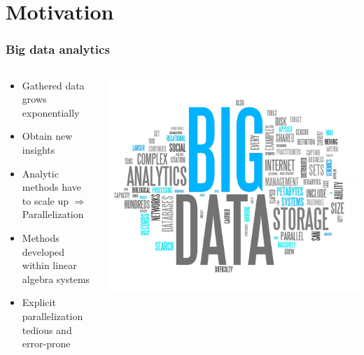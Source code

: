 \section{Motivation}

\begin{frame}
	\frametitle{Big data analytics}
	\begin{columns}
		\begin{column}{0.6\textwidth}
			\begin{itemize}
				\item Gathered data grows exponentially
				\item Obtain new insights
				\item Analytic methods have to scale up $\Rightarrow$ Parallelization
				\item Methods developed within linear algebra systems
				\item Explicit parallelization tedious and error-prone
			\end{itemize}
		\end{column}
		\begin{column}{0.4\textwidth}
			\includegraphics[width=\textwidth]{images/bigData.jpg}
		\end{column}
	\end{columns}
\end{frame}

